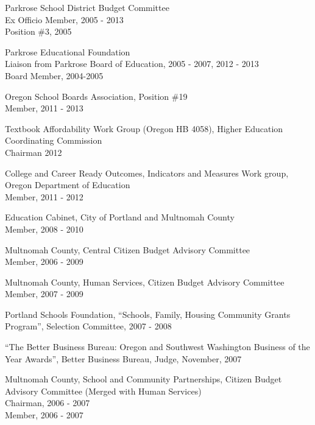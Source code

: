 \documentclass[Computer Science]{vita}
\begin{document}
\begin{vita}
\begin{Professional and Service Activities}
\begin{Community}
    \item Parkrose School District Budget Committee\\
      Ex Officio Member, 2005 - 2013\\
      Position \#3, 2005

\item Parkrose Educational Foundation\\
      Liaison from Parkrose Board of Education, 2005 - 2007, 2012 - 2013\\
      Board Member, 2004-2005


    \item Oregon School Boards Association, Position \#19\\
    Member, 2011 - 2013

  \item Textbook Affordability Work Group (Oregon HB 4058), Higher Education Coordinating Commission\\ Chairman 2012

\item College and Career Ready Outcomes, Indicators and Measures Work group, Oregon Department of Education\\
Member, 2011 -  2012

    \item  Education Cabinet, City of Portland and Multnomah County\\
      Member, 2008 - 2010

    \item Multnomah County, Central Citizen Budget Advisory Committee\\
      Member, 2006 - 2009

    \item Multnomah County, Human Services, Citizen Budget Advisory
      Committee\\Member, 2007 - 2009

    \item Portland Schools Foundation, ``Schools, Family, Housing
      Community Grants Program'', Selection Committee, 2007 - 2008

    \item ``The Better Business Bureau: Oregon and Southwest
      Washington Business of the Year Awards'', Better Business
      Bureau, Judge, November, 2007


    \item Multnomah County, School and Community Partnerships, Citizen Budget Advisory Committee (Merged with Human Services)\\
      Chairman, 2006 - 2007\\
      Member, 2006 - 2007
	

\end{Community}
\end{Professional and Service Activities}
\end{vita}
\end{document}
